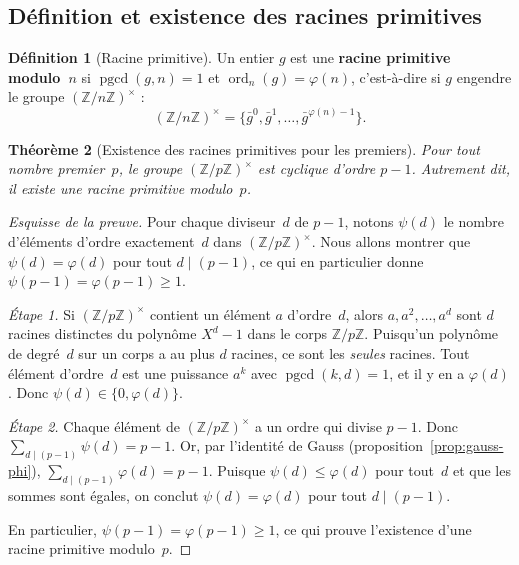 \documentclass[12pt,a4paper,openany]{book}
\theoremstyle{definition}
\newtheorem{definition}{Définition}[chapter]
\theoremstyle{plain}
\newtheorem{theoreme}[definition]{Théorème}
\theoremstyle{remark}
\newcommand{\Z}{\mathbb{Z}}
\DeclareMathOperator{\pgcd}{pgcd}
\DeclareMathOperator{\ord}{ord}
\begin{document}
\subsection{Définition et existence des racines primitives}
\label{subsec:rac-prim-def}

\begin{definition}[Racine primitive]
\label{def:racine-prim}
Un entier $g$ est une \textbf{racine primitive modulo~$n$} si $\pgcd(g, n) = 1$ et
$\ord_n(g) = \varphi(n)$, c'est-à-dire si $g$ engendre le groupe
$(\Z/n\Z)^\times$ :
\[
  (\Z/n\Z)^\times = \{ \bar{g}^0, \bar{g}^1, \ldots, \bar{g}^{\varphi(n)-1} \}.
\]
\end{definition}

\begin{theoreme}[Existence des racines primitives pour les premiers]
\label{thm:rac-prim-existe}
Pour tout nombre premier~$p$, le groupe $(\Z/p\Z)^\times$ est cyclique
d'ordre $p - 1$. Autrement dit, il existe une racine primitive modulo~$p$.
\end{theoreme}

\begin{proof}[Esquisse de la preuve]
Pour chaque diviseur~$d$ de $p - 1$, notons $\psi(d)$ le nombre d'éléments
d'ordre exactement~$d$ dans $(\Z/p\Z)^\times$. Nous allons montrer que
$\psi(d) = \varphi(d)$ pour tout $d \mid (p-1)$, ce qui en particulier donne
$\psi(p-1) = \varphi(p-1) \geqslant 1$.

\emph{Étape 1.} Si $(\Z/p\Z)^\times$ contient un élément $a$ d'ordre~$d$, alors
$a, a^2, \ldots, a^d$ sont $d$ racines distinctes du polynôme $X^d - 1$ dans le
corps $\Z/p\Z$. Puisqu'un polynôme de degré~$d$ sur un corps a au plus $d$ racines,
ce sont les \emph{seules} racines. Tout élément d'ordre~$d$ est une puissance
$a^k$ avec $\pgcd(k, d) = 1$, et il y en a $\varphi(d)$. Donc
$\psi(d) \in \{0, \varphi(d)\}$.

\emph{Étape 2.} Chaque élément de $(\Z/p\Z)^\times$ a un ordre qui divise $p - 1$.
Donc $\sum_{d \mid (p-1)} \psi(d) = p - 1$. Or, par l'identité de
Gauss (proposition~\ref{prop:gauss-phi}), $\sum_{d \mid (p-1)} \varphi(d) = p - 1$.
Puisque $\psi(d) \leqslant \varphi(d)$ pour tout~$d$ et que les sommes sont égales,
on conclut $\psi(d) = \varphi(d)$ pour tout $d \mid (p-1)$.

En particulier, $\psi(p-1) = \varphi(p-1) \geqslant 1$, ce qui prouve l'existence
d'une racine primitive modulo~$p$.
\end{proof}
\end{document}
